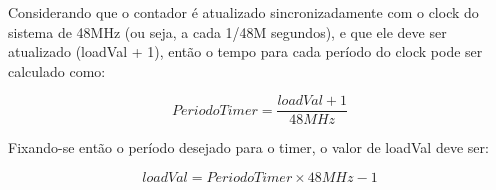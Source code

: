 Considerando que o contador é atualizado sincronizadamente com o clock do sistema de 48MHz (ou seja, a cada 1/48M segundos), e que ele deve ser atualizado (loadVal + 1), então o tempo para cada período do clock pode ser calculado como:

\begin{equation}
PeriodoTimer = \dfrac{loadVal + 1}{48MHz}
\end{equation}

Fixando-se então o período desejado para o timer, o valor de loadVal deve ser:

\begin{equation}
loadVal = PeriodoTimer \times 48MHz - 1
\end{equation}
